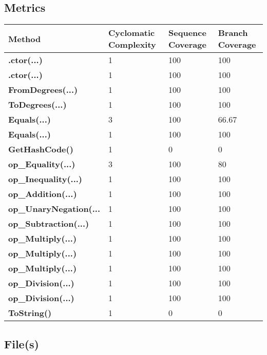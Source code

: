 \documentclass[a4paper,10pt]{article}
\begin{document}
\subsection{Metrics}
\begin{longtable}[l]{|l|l|l|l|}
\hline
\textbf{Method} & \textbf{Cyclomatic Complexity} & \textbf{Sequence Coverage} & \textbf{Branch Coverage}\\
\hline
\textbf{.ctor(...)} & 1 & 100 & 100\\
\hline
\textbf{.ctor(...)} & 1 & 100 & 100\\
\hline
\textbf{FromDegrees(...)} & 1 & 100 & 100\\
\hline
\textbf{ToDegrees(...)} & 1 & 100 & 100\\
\hline
\textbf{Equals(...)} & 3 & 100 & 66.67\\
\hline
\textbf{Equals(...)} & 1 & 100 & 100\\
\hline
\textbf{GetHashCode()} & 1 & 0 & 0\\
\hline
\textbf{op\_Equality(...)} & 3 & 100 & 80\\
\hline
\textbf{op\_Inequality(...)} & 1 & 100 & 100\\
\hline
\textbf{op\_Addition(...)} & 1 & 100 & 100\\
\hline
\textbf{op\_UnaryNegation(...} & 1 & 100 & 100\\
\hline
\textbf{op\_Subtraction(...)} & 1 & 100 & 100\\
\hline
\textbf{op\_Multiply(...)} & 1 & 100 & 100\\
\hline
\textbf{op\_Multiply(...)} & 1 & 100 & 100\\
\hline
\textbf{op\_Multiply(...)} & 1 & 100 & 100\\
\hline
\textbf{op\_Division(...)} & 1 & 100 & 100\\
\hline
\textbf{op\_Division(...)} & 1 & 100 & 100\\
\hline
\textbf{ToString()} & 1 & 0 & 0\\
\hline
\end{longtable}
\subsection{File(s)}
\end{document}
